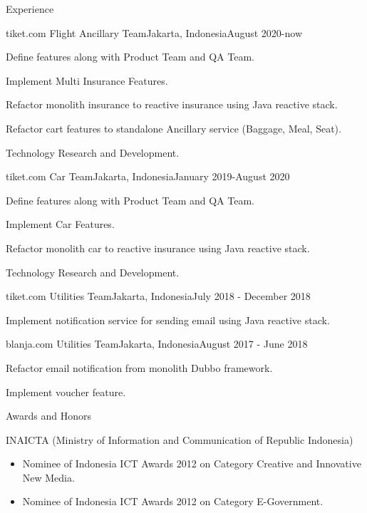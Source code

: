 \documentclass{article}
\newlength{\tabin}
\newlength{\secsep}
\newenvironment{tabbedsection}[1]{
  \begin{list}{}{
      \setlength{\itemsep}{0pt}
      \setlength{\labelsep}{0pt}
      \setlength{\labelwidth}{0pt}
      \setlength{\leftmargin}{\tabin}
      \setlength{\rightmargin}{\tabin}
      \setlength{\listparindent}{0pt}
      \setlength{\parsep}{0pt}
      \setlength{\parskip}{0pt}
      \setlength{\partopsep}{0pt}
      \setlength{\topsep}{#1}
    }
  \item[]
}{\end{list}}
\newenvironment{resume_subsection}[2][]{
  \textbf{#2} \hfill {\footnotesize #1} \hspace{2em}
  \begin{tabbedsection}{0.5\secsep}
}{\end{tabbedsection}}
\newenvironment{subitems}{
  \renewcommand{\labelitemi}{-}
  \begin{itemize}
      \setlength{\small\labelsep}{1em}
}{\end{itemize}}
\newenvironment{resume_employer}[4]{
  \vspace{\secsep}
  \large\textbf{#1} \\
  \indent {\small #2} \hfill {\footnotesize#3 (#4)}
  \begin{tabbedsection}{0pt}
  \begin{subitems}
}{\end{subitems}\end{tabbedsection}}
\newenvironment{resume_section}[1]{
    \textbf{\Large\ruleline{\color{teal}{#1}}}
  \begin{tabbedsection}{\secsep}
}{\end{tabbedsection}}
\newcommand*\ruleline[1]{\par\noindent\raisebox{0ex}{\makebox[\linewidth]{{#1}\hspace{1ex}\hrulefill}}}
\begin{document}
\begin{resume_section}{Experience}
    \begin{resume_employer}{tiket.com}
        {Flight Ancillary Team}{Jakarta, Indonesia}{August 2020-now}
        \item Define features along with Product Team and QA Team.
        \item Implement Multi Insurance Features.
        \item Refactor monolith insurance to reactive insurance using Java reactive stack.
        \item Refactor cart features to standalone Ancillary service (Baggage, Meal, Seat).
        \item Technology Research and Development. \\
      \end{resume_employer}
      \begin{resume_employer}{tiket.com}
        {Car Team}{Jakarta, Indonesia}{January 2019-August 2020}
        \item Define features along with Product Team and QA Team.
        \item Implement Car Features.
        \item Refactor monolith car to reactive insurance using Java reactive stack.
        \item Technology Research and Development. \\
      \end{resume_employer}
      \begin{resume_employer}{tiket.com}
        {Utilities Team}{Jakarta, Indonesia}{July 2018 - December 2018}
        \item Implement notification service for sending email using Java reactive stack. \\
      \end{resume_employer}
    
      \begin{resume_employer}{blanja.com}
        {Utilities Team}{Jakarta, Indonesia}{August 2017 - June 2018}
        \item Refactor email notification from monolith Dubbo framework.
        \item Implement voucher feature. \\
      \end{resume_employer}
\end{resume_section}

\begin{resume_section}{Awards and Honors}
    \begin{resume_subsection}[(2012)]{INAICTA (Ministry of Information and Communication of Republic Indonesia)}
    \begin{subitems}
      \item Nominee of Indonesia ICT Awards 2012 on Category Creative and Innovative New Media.
      \item Nominee of Indonesia ICT Awards 2012 on Category E-Government.
      \end{subitems}
    \end{resume_subsection}
\end{resume_section}
  
\end{document}
